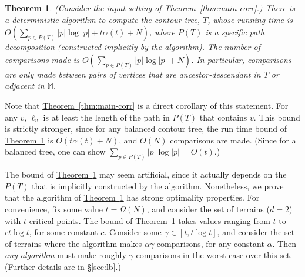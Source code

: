 \documentclass[11pt]{article}
\newtheorem{theorem}{Theorem}[section]
\theoremstyle{definition}
\newcommand{\MM}{\mathbb{M}}
\newcommand{\Sec}[1]{\hyperref[sec:#1]{\S\ref*{sec:#1}}} %
\newcommand{\Thm}[1]{\hyperref[thm:#1]{Theorem~\ref*{thm:#1}}} %
\newcommand{\thmConst}{\gamma}
\begin{document}
\begin{theorem} 
\label{thm:main-alg} 
(Consider the input setting of \Thm{main-corr}.)
There is a deterministic algorithm to compute the contour tree, $T$, whose running time is $O(\sum_{p \in P(T)} |p|\log |p| + t\alpha(t) + N)$,
where $P(T)$ is a specific path decomposition (constructed implicitly by the algorithm).
The number of comparisons made is $O(\sum_{p \in P(T)} |p|\log |p| + N)$.
In particular, comparisons are only made between pairs of vertices that are ancestor-descendant in $T$ or adjacent in $\MM$.
\end{theorem}

Note that \Thm{main-corr} is a direct corollary of this statement. For any $v$, $\ell_v$ is at least
the length of the path in $P(T)$ that contains $v$.
This bound is strictly stronger,
since for any balanced contour tree, the run time bound of \Thm{main-alg} is $O(t\alpha(t) + N)$, and $O(N)$
comparisons are made. (Since for a balanced tree, one can show $\sum_{p \in P(T)} |p|\log |p|= O(t)$.)

The bound of \Thm{main-alg} may seem artificial, since it actually depends on the $P(T)$ that
is implicitly constructed by the algorithm. Nonetheless, we prove that the algorithm of \Thm{main-alg}
has strong optimality properties. For convenience, fix some value $t=\Omega(N)$, and consider the set
of terrains ($d=2$) with $t$ critical points. The bound of \Thm{main-alg} takes values ranging
from $t$ to $c t\log t$, for some constant $c$. Consider some $\thmConst \in [t,t\log t]$, and consider the set of terrains
where the algorithm makes $\alpha \thmConst$ comparisons, for any constant $\alpha$. Then \emph{any algorithm} must make roughly $\thmConst$
comparisons in the worst-case over this set. (Further details are in \Sec{lb}.)
\end{document}

